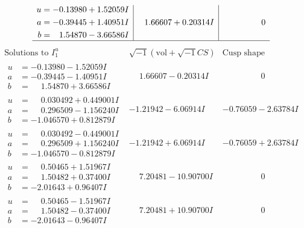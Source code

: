\documentclass[1p]{elsarticle_modified}
\theoremstyle{definition}
\newcommand{\I}{\sqrt{-1}}
\begin{document}
$$\begin{array}{c|c|c}
\begin{aligned}
u &= -0.13980 + 1.52059 I \\
a &= -0.39445 + 1.40951 I \\
b &= \phantom{-}1.54870 - 3.66586 I\end{aligned}
 & \phantom{-}1.66607 + 0.20314 I & \phantom{-0.000000 } 0\\
 \hline 
 \end{array}$$\newpage$$\begin{array}{c|c|c}  
\text{Solutions to }I^u_{1}& \I (\text{vol} + \sqrt{-1}CS) & \text{Cusp shape}\\
 \hline 
\begin{aligned}
u &= -0.13980 - 1.52059 I \\
a &= -0.39445 - 1.40951 I \\
b &= \phantom{-}1.54870 + 3.66586 I\end{aligned}
 & \phantom{-}1.66607 - 0.20314 I & \phantom{-0.000000 } 0 \\ \hline\begin{aligned}
u &= \phantom{-}0.030492 + 0.449001 I \\
a &= \phantom{-}0.296509 - 1.156240 I \\
b &= -1.046570 + 0.812879 I\end{aligned}
 & -1.21942 - 6.06914 I & -0.76059 - 2.63784 I \\ \hline\begin{aligned}
u &= \phantom{-}0.030492 - 0.449001 I \\
a &= \phantom{-}0.296509 + 1.156240 I \\
b &= -1.046570 - 0.812879 I\end{aligned}
 & -1.21942 + 6.06914 I & -0.76059 + 2.63784 I \\ \hline\begin{aligned}
u &= \phantom{-}0.50465 + 1.51967 I \\
a &= \phantom{-}1.50482 + 0.37400 I \\
b &= -2.01643 + 0.96407 I\end{aligned}
 & \phantom{-}7.20481 - 10.90700 I & \phantom{-0.000000 } 0 \\ \hline\begin{aligned}
u &= \phantom{-}0.50465 - 1.51967 I \\
a &= \phantom{-}1.50482 - 0.37400 I \\
b &= -2.01643 - 0.96407 I\end{aligned}
 & \phantom{-}7.20481 + 10.90700 I & \phantom{-0.000000 } 0 \\ \hline\begin{aligned}

\end{aligned}
\end{array}$$
\end{document}
